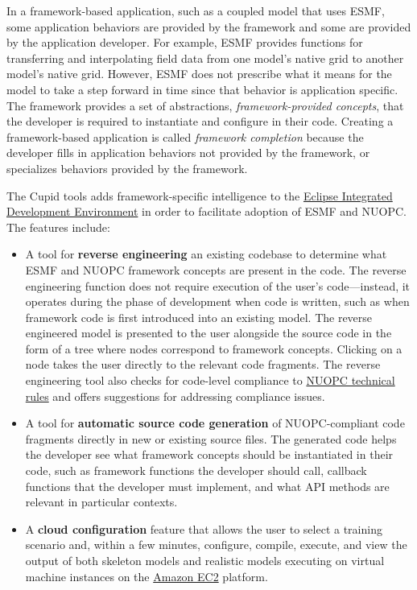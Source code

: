 \documentclass[oneside,11pt]{memoir}
\begin{document}
In a framework-based application, such as a coupled model that uses ESMF, some application behaviors are provided by the framework and some are provided by the application developer. For example, ESMF provides functions for transferring and interpolating field data from one model's native grid to another model's native grid. However, ESMF does not prescribe what it means for the model to take a step forward in time since that behavior is application specific. The framework provides a set of abstractions, \emph{framework-provided concepts}, that the developer is required to instantiate and configure in their code. Creating a framework-based application is called \emph{framework completion} because the developer fills in application behaviors not provided by the framework, or specializes  behaviors provided by the framework. 

The Cupid tools adds framework-specific intelligence to the \href{https://www.eclipse.org/}{Eclipse Integrated Development Environment} in order to facilitate adoption of ESMF and NUOPC. The features include:
\begin{itemize}

\item A tool for \textbf{reverse engineering} an existing codebase to determine what ESMF and NUOPC framework concepts are present in the code. The reverse engineering function does not require execution of the user's code---instead, it operates during the phase of development when code is written, such as when framework code is first introduced into an existing model. The reverse engineered model is presented to the user alongside the source code in the form of a tree where nodes correspond to framework concepts. Clicking on a node takes the user directly to the relevant code fragments. The reverse engineering tool also checks for code-level compliance to \href{https://earthsystemcog.org/projects/nuopc/esmf2nuopc}{NUOPC technical rules} and offers suggestions for addressing compliance issues.

\item A tool for \textbf{automatic source code generation} of NUOPC-compliant code fragments directly in new or existing source files.  The generated code helps the developer see what framework concepts should be instantiated in their code, such as framework functions the developer should call, callback functions that the developer must implement, and what API methods are relevant in particular contexts.

\item A \textbf{cloud configuration} feature that allows the user to select a training scenario and, within a few minutes, configure, compile, execute, and view the output of both skeleton models and realistic models executing on virtual machine instances on the \href{http://aws.amazon.com/ec2/}{Amazon EC2} platform.

\end{itemize}
\end{document}
